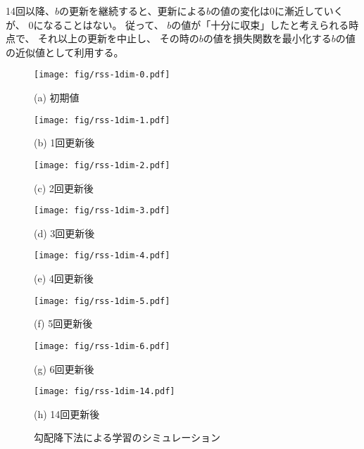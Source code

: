 14回以降、$b$の更新を継続すると、更新による$b$の値の変化は0に漸近していくが、
0になることはない。
従って、
$b$の値が「十分に収束」したと考えられる時点で、
それ以上の更新を中止し、
その時の$b$の値を損失関数を最小化する$b$の値の近似値として利用する。

\begin{figure}
  \centering
  \begin{minipage}{0.49\linewidth}
    \centering
    \texttt{[image: fig/rss-1dim-0.pdf]}

    (a) 初期値
  \end{minipage}
  \begin{minipage}{0.49\linewidth}
    \centering
    \texttt{[image: fig/rss-1dim-1.pdf]}

    (b) 1回更新後
  \end{minipage}

  \begin{minipage}{0.49\linewidth}
    \centering
    \texttt{[image: fig/rss-1dim-2.pdf]}

    (c) 2回更新後
  \end{minipage}
  \begin{minipage}{0.49\linewidth}
    \centering
    \texttt{[image: fig/rss-1dim-3.pdf]}

    (d) 3回更新後
  \end{minipage}

  \begin{minipage}{0.49\linewidth}
    \centering
    \texttt{[image: fig/rss-1dim-4.pdf]}

    (e) 4回更新後
  \end{minipage}
  \begin{minipage}{0.49\linewidth}
    \centering
    \texttt{[image: fig/rss-1dim-5.pdf]}

    (f) 5回更新後
  \end{minipage}

  \begin{minipage}{0.49\linewidth}
    \centering
    \texttt{[image: fig/rss-1dim-6.pdf]}

    (g) 6回更新後
  \end{minipage}
  \begin{minipage}{0.49\linewidth}
    \centering
    \texttt{[image: fig/rss-1dim-14.pdf]}

    (h) 14回更新後
  \end{minipage}

  \caption{勾配降下法による学習のシミュレーション}
  \label{fig:rss-1dim}
\end{figure}


